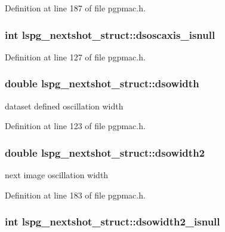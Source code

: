 Definition at line 187 of file pgpmac.h.\hypertarget{structlspg__nextshot__struct_a51a26391afcacfb4c946fb9e8e9ab6b0}{
\subsubsection[{dsoscaxis\_\-isnull}]{\setlength{\rightskip}{0pt plus 5cm}int {\bf lspg\_\-nextshot\_\-struct::dsoscaxis\_\-isnull}}}
\label{structlspg__nextshot__struct_a51a26391afcacfb4c946fb9e8e9ab6b0}


Definition at line 127 of file pgpmac.h.\hypertarget{structlspg__nextshot__struct_ad5a8f568a04aa6a13767933062b28f19}{
\subsubsection[{dsowidth}]{\setlength{\rightskip}{0pt plus 5cm}double {\bf lspg\_\-nextshot\_\-struct::dsowidth}}}
\label{structlspg__nextshot__struct_ad5a8f568a04aa6a13767933062b28f19}


dataset defined oscillation width 

Definition at line 123 of file pgpmac.h.\hypertarget{structlspg__nextshot__struct_a5378e13735a5392a9fcd853ce8c9e929}{
\subsubsection[{dsowidth2}]{\setlength{\rightskip}{0pt plus 5cm}double {\bf lspg\_\-nextshot\_\-struct::dsowidth2}}}
\label{structlspg__nextshot__struct_a5378e13735a5392a9fcd853ce8c9e929}


next image oscillation width 

Definition at line 183 of file pgpmac.h.\hypertarget{structlspg__nextshot__struct_a5ffd27b8063506fd54162658e5c2ce8a}{
\subsubsection[{dsowidth2\_\-isnull}]{\setlength{\rightskip}{0pt plus 5cm}int {\bf lspg\_\-nextshot\_\-struct::dsowidth2\_\-isnull}}}
\label{structlspg__nextshot__struct_a5ffd27b8063506fd54162658e5c2ce8a}


